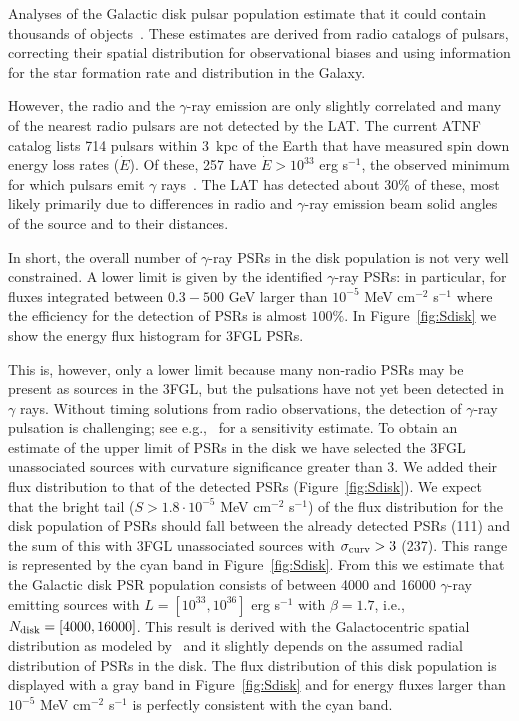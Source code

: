\documentclass[iop]{emulateapj}
\begin{document}
Analyses of the Galactic disk pulsar population estimate that it could
contain thousands of
objects~\citep{2013MNRAS.434.1387L,2013IAUS..291..237L,2004IAUS..218..105L}. These
estimates are derived from radio catalogs of pulsars, correcting
their spatial distribution for observational biases and using
information for the star formation rate and distribution in the
Galaxy.  

However, the radio and the $\gamma$-ray emission are only
  slightly correlated and many of the nearest radio pulsars are not
  detected by the LAT.  The current ATNF catalog lists 714 pulsars
  within 3~kpc of the Earth that have measured spin down energy loss
  rates ($\dot{E}$).  Of these, 257 have $\dot{E} > 10^{33}$ erg s$^{-1}$, the
  observed minimum for which pulsars emit $\gamma$
  rays~\citep{2016A&A...587A.109G}.  The LAT has detected about 30\% of
  these, most likely primarily due to differences 
  in radio and $\gamma$-ray emission beam solid angles of
  the source and to their distances.

In short, the overall number of $\gamma$-ray PSRs in the disk
population is not very well constrained.  A lower limit
is given by the identified $\gamma$-ray PSRs: in particular, for
fluxes integrated between $0.3-500$ GeV larger than $10^{-5}$
MeV cm$^{-2}$ s$^{-1}$ where the efficiency for the detection of PSRs is almost
$100\%$.  In Figure~\ref{fig:Sdisk} we
show the energy flux histogram for 3FGL PSRs.

This is, however, only a lower limit because many non-radio
PSRs may be present as sources in the 3FGL, but the pulsations have
not yet been detected in $\gamma$ rays. Without timing solutions
from radio observations, the detection of $\gamma$-ray pulsation is
challenging; see e.g.,~\citet{2011ApJ...742..126D} for a sensitivity
estimate.  To obtain an estimate of the upper limit of PSRs in the
disk we have selected the 3FGL unassociated sources with curvature
significance greater than 3.  We added their flux distribution to that
of the detected PSRs (Figure~\ref{fig:Sdisk}).  We expect that the
bright tail ($S>1.8 \cdot 10^{-5}$ MeV cm$^{-2}$ s$^{-1}$) of the flux
distribution for the disk population of PSRs should fall between the
already detected PSRs (111) and the sum of this with 3FGL unassociated
sources with $\sigma_{\rm{curv}}>3$ (237). This range is represented
by the cyan band in Figure~\ref{fig:Sdisk}.  
From this we estimate
that the Galactic disk PSR population consists of between 4000 and
16000 $\gamma$-ray emitting sources with $L  = [10^{33},10^{36}]$ erg s$^{-1}$ with $\beta=1.7$,
i.e., $N_{\rm disk} = [4000, 16000]$. This result is derived
with the Galactocentric spatial distribution as modeled
by~\citet{2004IAUS..218..105L} and it slightly depends on the
assumed radial distribution of PSRs in the disk.  The flux
distribution of this disk population is displayed with a gray band in
Figure~\ref{fig:Sdisk} and for energy fluxes larger than $10^{-5}$ MeV
cm$^{-2}$ s$^{-1}$ is perfectly consistent with the cyan band. 
\end{document}
